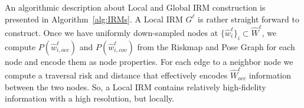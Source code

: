 \documentclass[letterpaper]{article} %
\newcommand{\phdone}[1]{} %
\begin{document}
\phdone{Local IRM}
An algorithmic description about Local and Global IRM construction is presented in Algorithm~\ref{alg:IRMs}.
%
A Local IRM $G^\ell$ is rather straight forward to construct.
Once we have uniformly down-sampled nodes at $\{\hat{w}^\ell_i\}_i \subset \hat{W}^\ell$,
we compute $P(\hat{w}^\ell_{i,occ})$ and $P(\hat{w}^\ell_{i,cov})$ from the Riskmap and Pose Graph for each node and encode them as node properties.
For each edge to a neighbor node we compute a traversal risk and distance that effectively encodes $\hat{W}^\ell_{occ}$ information between the two nodes.
So, a Local IRM contains relatively high-fidelity information with a high resolution, but locally.







\end{document}
